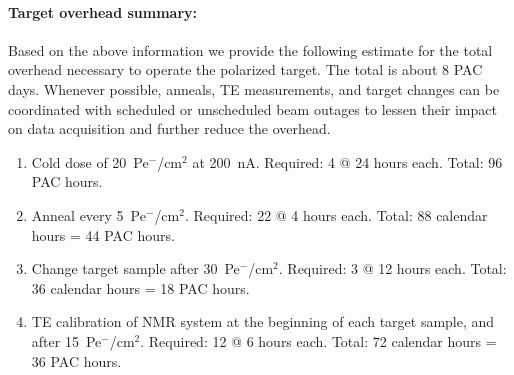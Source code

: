 \paragraph{Target overhead summary:}
Based on the above information we provide the following estimate for the total overhead necessary to operate the polarized target.  The total is about 8 PAC days.  Whenever possible, anneals, TE measurements, and target changes can be coordinated with scheduled or unscheduled beam outages to lessen their impact on data acquisition and further reduce the overhead.  
\begin{enumerate}
  \item{Cold dose of 20~Pe$^{\minus}$/cm$^2$ at 200~nA.  Required: 4 @ 24 hours each. 
    Total: 96 PAC hours.}  
    \item{Anneal every 5~Pe$^{\minus}$/cm$^2$.  Required: 22 @ 4 hours each. 
      Total: 88 calendar hours = 44 PAC hours.}
      \item{Change target sample after 30~Pe$^{\minus}$/cm$^2$.  Required: 3 @ 12 hours each.  
      Total: 36 calendar hours = 18 PAC hours.}
        \item{TE calibration of NMR system at the beginning of each target sample, and after 
          15~Pe$^{\minus}$/cm$^2$.  Required: 12 @ 6 hours each.  
          Total: 72 calendar hours = 36 PAC hours}.
\end{enumerate}

